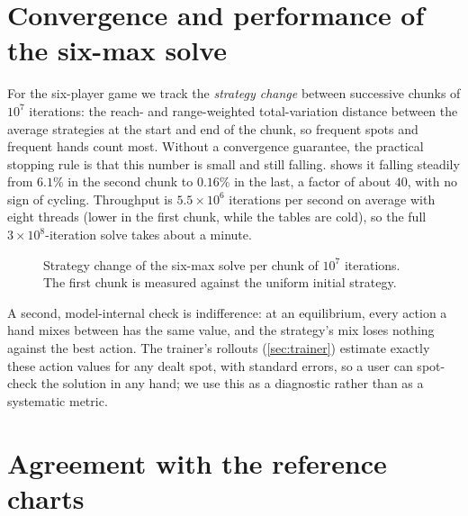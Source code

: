 \section{Convergence and performance of the six-max solve}\label{sec:res-convergence}

For the six-player game we track the \emph{strategy change} between successive chunks of $10^7$ iterations: the reach- and range-weighted total-variation distance between the average strategies at the start and end of the chunk, so frequent spots and frequent hands count most. Without a convergence guarantee, the practical stopping rule is that this number is small and still falling.  shows it falling steadily from $6.1\%$ in the second chunk to $0.16\%$ in the last, a factor of about $40$, with no sign of cycling. Throughput is $5.5\times 10^6$ iterations per second on average with eight threads (lower in the first chunk, while the tables are cold), so the full $3\times 10^8$-iteration solve takes about a minute.

\begin{figure}[ht]
\centering
{}
\caption{Strategy change of the six-max solve per chunk of $10^7$ iterations. The first chunk is measured against the uniform initial strategy.}
\label{fig:convergence}
\end{figure}

A second, model-internal check is indifference: at an equilibrium, every action a hand mixes between has the same value, and the strategy's mix loses nothing against the best action. The trainer's rollouts (\cref{sec:trainer}) estimate exactly these action values for any dealt spot, with standard errors, so a user can spot-check the solution in any hand; we use this as a diagnostic rather than as a systematic metric.

\section{Agreement with the reference charts}\label{sec:res-charts}

